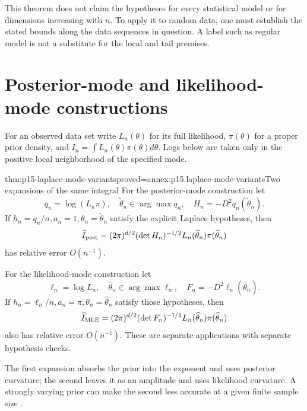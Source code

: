 This theorem does not claim the hypotheses for every statistical model or
for dimensions increasing with \(n\). To apply it to random data, one must
establish the stated bounds along the data sequences in question. A label
such as regular model is not a substitute for the local and tail premises.

\section{Posterior-mode and likelihood-mode constructions}
\label{sec:p15-laplace-mode-variants}

For an observed data set write \(L_n(\theta)\) for its full likelihood,
\(\pi(\theta)\) for a proper prior density, and
\(I_n=\int L_n(\theta)\pi(\theta)d\theta\). Logs below are taken only in
the positive local neighborhood of the specified mode.

\begin{hbcorollary}{thm:p15-laplace-mode-variants}{proved=annex:p15.laplace-mode-variants}{Two expansions of the same integral}
For the posterior-mode construction let
\[
 q_n=\log(L_n\pi),\quad \widetilde\theta_n\in\arg\max q_n,\quad
 H_n=-D^2q_n(\widetilde\theta_n).
\]
If \(h_n=q_n/n,a_n=1,\theta_n=\widetilde\theta_n\) satisfy the explicit
Laplace hypotheses, then
\[
 \widehat I_{\rm post}
 =(2\pi)^{d/2}(\det H_n)^{-1/2}
                L_n(\widetilde\theta_n)\pi(\widetilde\theta_n)
\]
has relative error \(O(n^{-1})\).

For the likelihood-mode construction let
\[
 \ell_n=\log L_n,\quad \widehat\theta_n\in\arg\max\ell_n,\quad
 F_n=-D^2\ell_n(\widehat\theta_n).
\]
If \(h_n=\ell_n/n,a_n=\pi,\theta_n=\widehat\theta_n\) satisfy those
hypotheses, then
\[
 \widehat I_{\rm MLE}
 =(2\pi)^{d/2}(\det F_n)^{-1/2}
                  L_n(\widehat\theta_n)\pi(\widehat\theta_n)
\]
also has relative error \(O(n^{-1})\). These are separate applications
with separate hypothesis checks.
\end{hbcorollary}

The first expansion absorbs the prior into the exponent and uses posterior
curvature; the second leaves it as an amplitude and uses likelihood
curvature. A strongly varying prior can make the second less accurate at a
given finite sample size \cite[Secs.~4.1.1--4.1.2]{KassRaftery1995BayesFactors}.

